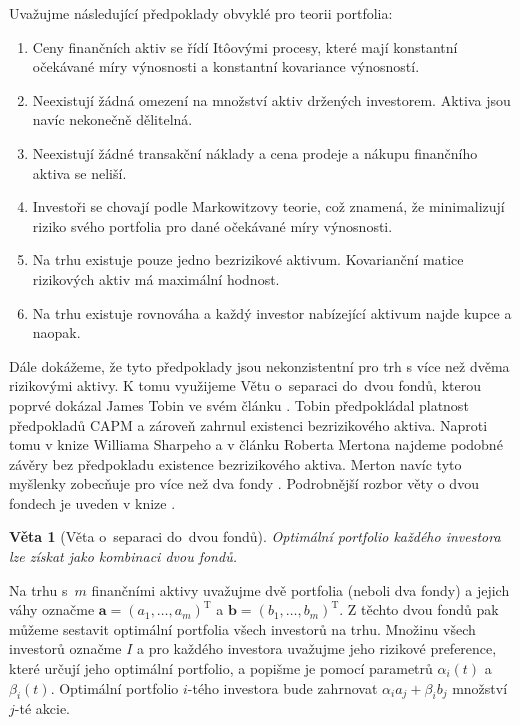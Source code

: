 \documentclass[a4paper,12pt]{report}
\newtheorem{veta}{Věta}
\theoremstyle{definition} \newtheorem{definice}[veta]{Definice}
\theoremstyle{remark}
\begin{document}
Uvažujme následující předpoklady obvyklé pro teorii portfolia:
\begin{enumerate}
\item \label{predpoklad_konstantnosti_vynosu_a_rizika} Ceny finančních aktiv se řídí It\^oovými procesy, které mají konstantní očekávané míry výnosnosti a konstantní kovariance výnosností. 
\item Neexistují žádná omezení na množství aktiv držených investorem. Aktiva jsou navíc nekonečně dělitelná.
\item Neexistují žádné transakční náklady a cena prodeje a nákupu finančního aktiva se neliší.
\item Investoři se chovají podle Markowitzovy teorie, což znamená, že minimalizují riziko svého portfolia pro dané očekávané míry výnosnosti.
\item \label{predpoklad_hodnost} Na trhu existuje pouze jedno bezrizikové aktivum. Kovarianční matice rizikových aktiv má maximální hodnost.
\item \label{predpoklad_konstantnosti_N} Na trhu existuje rovnováha a každý investor nabízející aktivum najde kupce a naopak.
\end{enumerate}

Dále dokážeme, že tyto předpoklady jsou nekonzistentní pro trh s více než dvěma rizikovými aktivy.
K tomu využijeme Větu o~separaci do~dvou fondů, kterou poprvé dokázal  James Tobin ve svém článku \cite{tobin}. 
Tobin předpokládal platnost předpokladů CAPM a zároveň zahrnul existenci bezrizikového aktiva.
Naproti tomu v knize Williama Sharpeho \cite{sharpe} a v článku Roberta Mertona \cite{merton} najdeme podobné závěry bez předpokladu existence bezrizikového aktiva.
Merton navíc tyto myšlenky zobecňuje pro více než dva fondy \cite{merton1973}.
Podrobnější rozbor věty o dvou fondech je uveden v knize \cite{cass1970structure}.
\begin{veta}[Věta o~separaci do~dvou fondů]
Optimální portfolio každého investora lze získat jako kombinaci dvou fondů.
\end{veta}

Na trhu s~$m$ finančními aktivy uvažujme dvě portfolia (neboli dva fondy) a jejich váhy označme $\boldsymbol{a}=(a_1,\dots,a_m)^\mathrm{T}$ a $\boldsymbol{b}=(b_1,\dots,b_m)^\mathrm{T}$. Z těchto dvou fondů pak můžeme sestavit optimální portfolia všech investorů na trhu.
Množinu všech investorů označme $I$ a pro každého investora uvažujme jeho rizikové preference, které určují jeho optimální portfolio, a popišme je pomocí parametrů $\alpha_i(t)$ a $\beta_i(t)$.
Optimální portfolio $i$-tého investora bude zahrnovat $\alpha_ia_j+\beta_ib_j$ množství $j$-té akcie.
\end{document}
